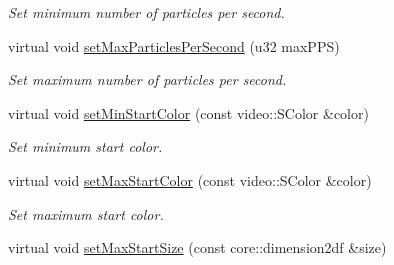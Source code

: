 \begin{DoxyCompactItemize}
\begin{DoxyCompactList}\small\item\em Set minimum number of particles per second. \end{DoxyCompactList}\item 
\hypertarget{classirr_1_1scene_1_1_c_particle_sphere_emitter_a7fb24298a70005ee7b76d013270f3ca4}{virtual void \hyperlink{classirr_1_1scene_1_1_c_particle_sphere_emitter_a7fb24298a70005ee7b76d013270f3ca4}{set\-Max\-Particles\-Per\-Second} (u32 max\-P\-P\-S)}\label{classirr_1_1scene_1_1_c_particle_sphere_emitter_a7fb24298a70005ee7b76d013270f3ca4}

\begin{DoxyCompactList}\small\item\em Set maximum number of particles per second. \end{DoxyCompactList}\item 
\hypertarget{classirr_1_1scene_1_1_c_particle_sphere_emitter_a5112c86cdefc9ba1b99191293b26b365}{virtual void \hyperlink{classirr_1_1scene_1_1_c_particle_sphere_emitter_a5112c86cdefc9ba1b99191293b26b365}{set\-Min\-Start\-Color} (const video\-::\-S\-Color \&color)}\label{classirr_1_1scene_1_1_c_particle_sphere_emitter_a5112c86cdefc9ba1b99191293b26b365}

\begin{DoxyCompactList}\small\item\em Set minimum start color. \end{DoxyCompactList}\item 
\hypertarget{classirr_1_1scene_1_1_c_particle_sphere_emitter_a691333988f90ba6552e60f9ff9b5c507}{virtual void \hyperlink{classirr_1_1scene_1_1_c_particle_sphere_emitter_a691333988f90ba6552e60f9ff9b5c507}{set\-Max\-Start\-Color} (const video\-::\-S\-Color \&color)}\label{classirr_1_1scene_1_1_c_particle_sphere_emitter_a691333988f90ba6552e60f9ff9b5c507}

\begin{DoxyCompactList}\small\item\em Set maximum start color. \end{DoxyCompactList}\item 
\hypertarget{classirr_1_1scene_1_1_c_particle_sphere_emitter_a0dbc7f536698048fcde6ff2e24d1a515}{virtual void \hyperlink{classirr_1_1scene_1_1_c_particle_sphere_emitter_a0dbc7f536698048fcde6ff2e24d1a515}{set\-Max\-Start\-Size} (const core\-::dimension2df \&size)}\label{classirr_1_1scene_1_1_c_particle_sphere_emitter_a0dbc7f536698048fcde6ff2e24d1a515}


\end{DoxyCompactItemize}
